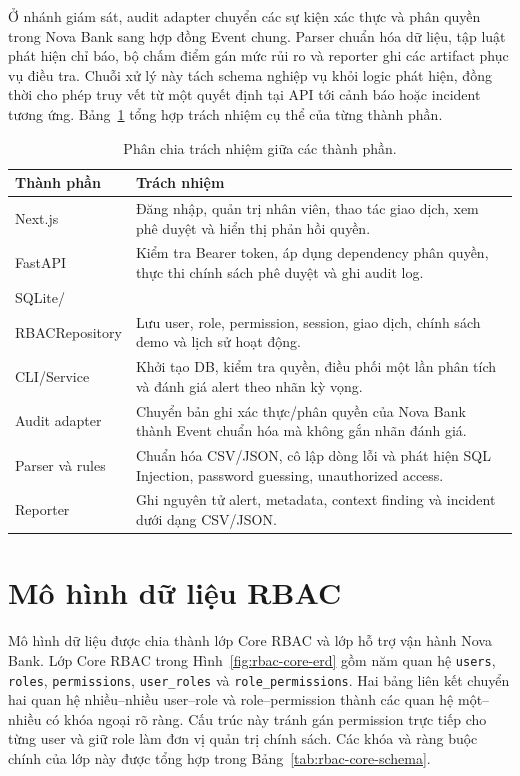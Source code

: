 Ở nhánh giám sát, audit adapter chuyển các sự kiện xác thực và phân quyền trong
Nova Bank sang hợp đồng Event chung. Parser chuẩn hóa dữ liệu, tập luật phát
hiện chỉ báo, bộ chấm điểm gán mức rủi ro và reporter ghi các artifact phục vụ
điều tra. Chuỗi xử lý này tách schema nghiệp vụ khỏi logic phát hiện, đồng thời
cho phép truy vết từ một quyết định tại API tới cảnh báo hoặc incident tương
ứng. Bảng~\ref{tab:components} tổng hợp trách nhiệm cụ thể của từng thành phần.

\begin{table}[htbp]
\centering
\small
\begin{tabularx}{\textwidth}{p{}X}
\toprule
Thành phần & Trách nhiệm \\
\midrule
Next.js & Đăng nhập, quản trị nhân viên, thao tác giao dịch, xem phê duyệt và hiển thị phản hồi quyền. \\
FastAPI & Kiểm tra Bearer token, áp dụng dependency phân quyền, thực thi chính sách phê duyệt và ghi audit log. \\
SQLite/\\ RBACRepository & Lưu user, role, permission, session, giao dịch, chính sách demo và lịch sử hoạt động. \\
CLI/Service & Khởi tạo DB, kiểm tra quyền, điều phối một lần phân tích và đánh giá alert theo nhãn kỳ vọng. \\
Audit adapter & Chuyển bản ghi xác thực/phân quyền của Nova Bank thành Event chuẩn hóa mà không gắn nhãn đánh giá. \\
Parser và rules & Chuẩn hóa CSV/JSON, cô lập dòng lỗi và phát hiện SQL Injection, password guessing, unauthorized access. \\
Reporter & Ghi nguyên tử alert, metadata, context finding và incident dưới dạng CSV/JSON. \\
\bottomrule
\end{tabularx}
\caption{Phân chia trách nhiệm giữa các thành phần.}
\label{tab:components}
\end{table}

\section{Mô hình dữ liệu RBAC}

Mô hình dữ liệu được chia thành lớp Core RBAC và lớp hỗ trợ vận hành Nova Bank.
Lớp Core RBAC trong Hình~\ref{fig:rbac-core-erd} gồm năm quan hệ
\texttt{users}, \texttt{roles}, \texttt{permissions},
\texttt{user\_roles} và \texttt{role\_permissions}. Hai bảng liên kết chuyển
hai quan hệ nhiều--nhiều user--role và role--permission thành các quan hệ
một--nhiều có khóa ngoại rõ ràng. Cấu trúc này tránh gán permission trực tiếp
cho từng user và giữ role làm đơn vị quản trị chính sách. Các khóa và ràng buộc
chính của lớp này được tổng hợp trong Bảng~\ref{tab:rbac-core-schema}.


